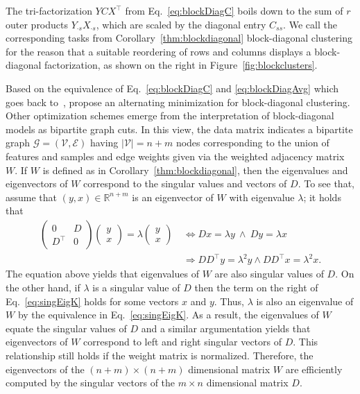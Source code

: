 The tri-factorization $YCX^\top$ from Eq.~\@\eqref{eq:blockDiagC} boils down to the sum of $r$ outer products $Y_{\cdot s}X_{\cdot s}$, which are scaled by the diagonal entry $C_{ss}$. We call the corresponding tasks from Corollary~\ref{thm:blockdiagonal} block-diagonal clustering for the reason that a suitable reordering of rows and columns displays a block-diagonal factorization, as shown on the right in Figure~\ref{fig:blockclusters}.

Based on the equivalence of Eq.~\eqref{eq:blockDiagC} and \eqref{eq:blockDiagAvg} which goes back to~\cite{mirkin1995additive}, \cite{han2017bilateral} propose an alternating minimization for block-diagonal clustering.
Other optimization schemes emerge from the interpretation of 
block-diagonal models as bipartite graph cuts. In this view, the data matrix indicates a bipartite graph $\mathcal{G}=(\mathcal{V},\mathcal{E})$ having $|\mathcal{V}|=n+m$ nodes corresponding to the union of features and samples and edge weights given via the weighted adjacency matrix $W$.
If $W$ is defined as in Corollary~\ref{thm:blockdiagonal}, then the eigenvalues and eigenvectors of $W$ correspond to the singular values and vectors of $D$. To see that, assume that $(y,x)\in\mathbb{R}^{n+m}$ is an eigenvector of $W$ with eigenvalue $\lambda$; it holds that
\begin{align}
\begin{pmatrix}
0 & D\\
D^\top & 0
\end{pmatrix}
\begin{pmatrix}
y\\x
\end{pmatrix}
= \lambda \begin{pmatrix}
y\\ x
\end{pmatrix}\ 
&\Leftrightarrow Dx=\lambda y \ \wedge \ Dy=\lambda x\label{eq:singEigK}\\
&\Rightarrow DD^\top y = \lambda^2 y \wedge DD^\top x=\lambda^2 x. \nonumber
\end{align}
The equation above yields that eigenvalues of $W$ are also singular values of $D$. On the other hand, if $\lambda$ is a singular value of $D$ then the term on the right of Eq.~\eqref{eq:singEigK} holds for some vectors $x$ and $y$. Thus, $\lambda$ is also an eigenvalue of $W$ by the equivalence in Eq.~\eqref{eq:singEigK}. As a result, the eigenvalues of $W$ equate the singular values of $D$ and a similar argumentation yields that eigenvectors of $W$ correspond to left and right singular vectors of $D$. This relationship still holds if the weight matrix is normalized. Therefore, the eigenvectors of the $(n+m)\times (n+m)$ dimensional matrix $W$ are efficiently computed by the singular vectors of the $m\times n$ dimensional matrix $D$. 

